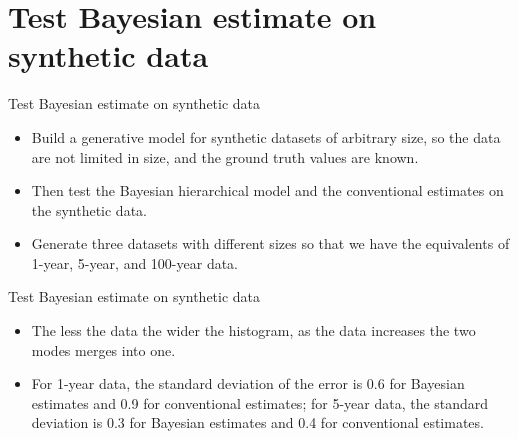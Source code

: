 \documentclass{beamer}
\begin{document}
\section{Test Bayesian estimate on synthetic data}
\begin{frame}{Test Bayesian estimate on synthetic data}
\begin{block}{}
\begin{itemize}
  \item Build a generative model for synthetic datasets of arbitrary
size, so the data are not limited in size, and the ground truth
values are known.
\item  Then test the Bayesian hierarchical model
and the conventional estimates on the synthetic data.
\item  Generate three datasets with different sizes so that we have
the equivalents of 1-year, 5-year, and 100-year data. 
\end{itemize}
\end{block}
\end{frame}


\begin{frame}{Test Bayesian estimate on synthetic data}
\begin{block}{}
\begin{itemize}
  \item The less the data the wider the histogram, as the data increases the two modes merges into one.
  \item For 1-year data, the standard deviation of the error is 0.6 for
Bayesian estimates and 0.9 for conventional estimates; for 5-year
data, the standard deviation is 0.3 for Bayesian estimates and 0.4
for conventional estimates.
\end{itemize}
\begin{figure}
    \centering
    \qquad
    \label{fig:example}
\end{figure}
\end{block}
\end{frame}
\end{document}
